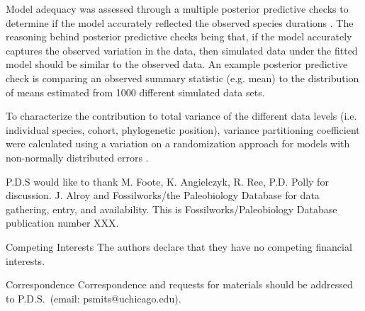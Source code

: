 \documentclass{nature}
\begin{document}
\begin{methods}
  Model adequacy was assessed through a multiple posterior predictive checks to determine if the model accurately reflected the observed species durations \cite{Gelman2013d}. The reasoning behind posterior predictive checks being that, if the model accurately captures the observed variation in the data, then simulated data under the fitted model should be similar to the observed data. An example posterior predictive check is comparing an observed summary statistic (e.g. mean) to the distribution of means estimated from 1000 different simulated data sets.

  To characterize the contribution to total variance of the different data levels (i.e. individual species, cohort, phylogenetic position), variance partitioning coefficient were calculated using a variation on a randomization approach for models with non-normally distributed errors \cite{Goldstein2002}.



\end{methods}






\begin{addendum}
\item P.D.S would like to thank M. Foote, K. Angielczyk, R. Ree, P.D. Polly for discussion. J. Alroy and Fossilworks/the Paleobiology Database for data gathering, entry, and availability. This is Fossilworks/Paleobiology Database publication number XXX.
\item[Competing Interests] The authors declare that they have no
  competing financial interests.
\item[Correspondence] Correspondence and requests for materials
  should be addressed to P.D.S.~(email: psmits@uchicago.edu).
\end{addendum}
\end{document}

